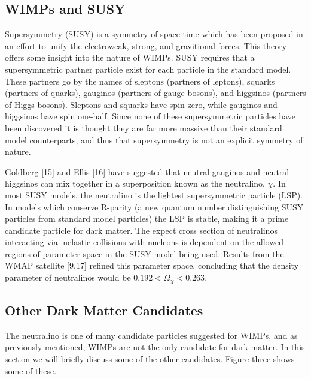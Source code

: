 \documentclass[a4paper,12pt]{article}
\begin{document}
\subsection{WIMPs and SUSY}

Supersymmetry (SUSY) is a symmetry of space-time which has been proposed in an effort to unify the electroweak, strong, and gravitional forces.  This theory offers some insight into the nature of WIMPs.  SUSY requires that a supersymmetric partner particle exist for each particle in the standard model.  These partners go by the names of sleptons (partners of leptons), squarks (partners of quarks), gauginos (partners of gauge bosons), and higgsinos (partners of Higgs bosons).  Sleptons and squarks have spin zero, while gauginos and higgsinos have spin one-half.  Since none of these supersymmetric particles have been discovered it is thought they are far more massive than their standard model counterparts, and thus that supersymmetry is not an explicit symmetry of nature.
  
Goldberg [15] and Ellis [16] have suggested that neutral gauginos and neutral higgsinos can mix together in a superposition known as the neutralino, $\chi$.  In most SUSY models, the neutralino is the lightest supersymmetric particle (LSP).  In models which conserve R-parity (a new quantum number distinguishing SUSY particles from standard model particles) the LSP is stable, making it a prime candidate particle for dark matter.  The expect cross section of neutralinos interacting via inelastic collisions with nucleons is dependent on the allowed regions of parameter space in the SUSY model being used.  Results from the WMAP satellite [9,17] refined this parameter space, concluding that the density parameter of neutralinos would be  $0.192 < \Omega_\chi < 0.263$.

\subsection{Other Dark Matter Candidates}

The neutralino is one of many candidate particles suggested for WIMPs, and as previously mentioned, WIMPs are not the only candidate for dark matter.  In this section we will briefly discuss some of the other candidates.  Figure three shows some of these.  
\end{document}

